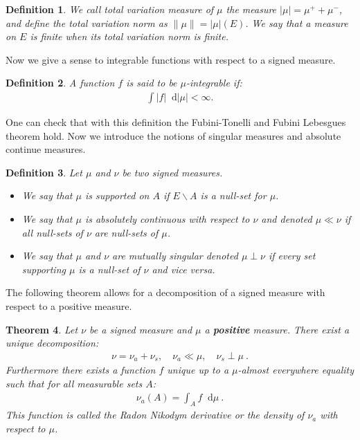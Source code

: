 \documentclass[11pt,a4paper]{article}
\newcommand{\dd}{\mathop{}\!\mathrm{d}}
\newtheorem{theorem}{Theorem}[section]
\newtheorem{definition}[theorem]{Definition}
\begin{document}
\begin{definition}
    We call total variation measure of $\mu$ the measure $|\mu| = \mu^+ + \mu^-$, and define the total variation norm as $\|\mu\| = |\mu|(E)$. We say that a measure on $E$ is finite when its total variation norm is finite.
\end{definition}
Now we give a sense to integrable functions with respect to a signed measure.
\begin{definition}
    A function $f$ is said to be $\mu$-integrable if:
    \begin{align*}
        \int |f|\dd |\mu| < \infty.
    \end{align*}
\end{definition}
One can check that with this definition the Fubini-Tonelli and Fubini Lebesgues theorem hold. Now we introduce the notions of singular measures and absolute continue measures. 

\begin{definition}
    Let $\mu$ and $\nu$ be two signed measures.
    \begin{itemize}
        \item We say that $\mu$ is supported on $A$ if $E\backslash A$ is a null-set for $\mu$.
        \item We say that $\mu$ is absolutely continuous with respect to $\nu$ and denoted $\mu \ll \nu$ if all null-sets of $\nu$ are null-sets of $\mu$.
        \item We say that $\mu$ and $\nu$ are mutually singular denoted $\mu \perp \nu$ if every set supporting $\mu$ is a null-set of $\nu$ and vice versa.
    \end{itemize}
\end{definition}
The following theorem allows for a decomposition of a signed measure with respect to a positive measure.
\begin{theorem}
    Let $\nu$ be a signed measure and $\mu$ a \textbf{positive} measure. There exist a unique decomposition:
    \begin{align*}
        \nu = \nu_{a} + \nu_s, \quad  \nu_{a}\ll \mu, \quad \nu_s \perp \mu \ .
    \end{align*}
    Furthermore there exists a function $f$ unique up to a $\mu$-almost everywhere equality such that for all measurable sets $A$:
    \begin{align*}
        \nu_{a}(A) = \int_A f\dd \mu\ .
    \end{align*}
    This function is called the Radon Nikodym derivative or the density of $\nu_{a}$ with respect to $\mu$.
\end{theorem}
\end{document}
